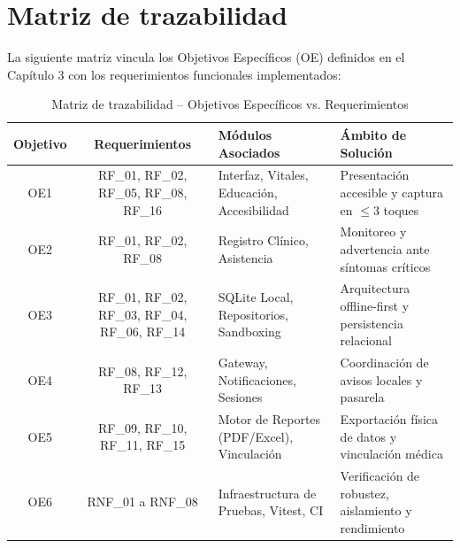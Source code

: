 \section{Matriz de trazabilidad}

La siguiente matriz vincula los Objetivos Específicos (OE) definidos en el Capítulo 3 con los requerimientos funcionales implementados:

\begin{table}[H]
\centering
\renewcommand{\arraystretch}{1.3}
\setlength{\tabcolsep}{6pt}
\begin{tabularx}{\textwidth}{|c|c|X|l|}
\hline
\textbf{Objetivo} & \textbf{Requerimientos} & \textbf{Módulos Asociados} & \textbf{Ámbito de Solución} \\ \hline
OE1 & RF\_01, RF\_02, RF\_05, RF\_08, RF\_16 & Interfaz, Vitales, Educación, Accesibilidad & Presentación accesible y captura en $\le 3$ toques \\ \hline
OE2 & RF\_01, RF\_02, RF\_08 & Registro Clínico, Asistencia & Monitoreo y advertencia ante síntomas críticos \\ \hline
OE3 & RF\_01, RF\_02, RF\_03, RF\_04, RF\_06, RF\_14 & SQLite Local, Repositorios, Sandboxing & Arquitectura offline-first y persistencia relacional \\ \hline
OE4 & RF\_08, RF\_12, RF\_13 & Gateway, Notificaciones, Sesiones & Coordinación de avisos locales y pasarela \\ \hline
OE5 & RF\_09, RF\_10, RF\_11, RF\_15 & Motor de Reportes (PDF/Excel), Vinculación & Exportación física de datos y vinculación médica \\ \hline
OE6 & RNF\_01 a RNF\_08 & Infraestructura de Pruebas, Vitest, CI & Verificación de robustez, aislamiento y rendimiento \\ \hline
\end{tabularx}
\caption{Matriz de trazabilidad – Objetivos Específicos vs. Requerimientos}
\label{tab:trazabilidad}
\end{table}
